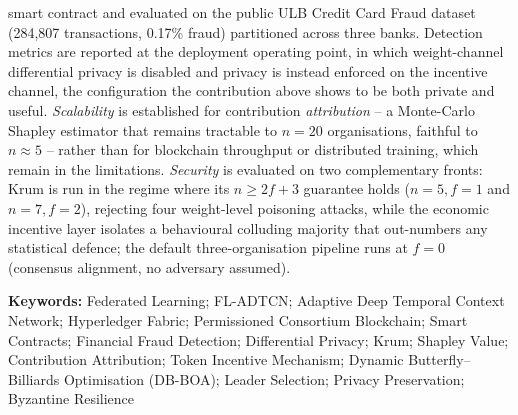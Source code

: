 smart contract and evaluated on the public ULB Credit Card Fraud dataset (284{,}807 transactions,
0.17\% fraud) partitioned across three banks. Detection metrics are reported at the deployment
operating point, in which weight-channel differential privacy is disabled and privacy is instead
enforced on the incentive channel, the configuration the contribution above shows to be both
private and useful. \emph{Scalability} is established for contribution \emph{attribution} -- a
Monte-Carlo Shapley estimator that remains tractable to $n=20$ organisations, faithful to
$n\approx 5$ -- rather than for blockchain throughput or distributed training, which remain in the
limitations. \emph{Security} is evaluated on two complementary fronts: Krum is run in the regime
where its $n\ge 2f+3$ guarantee holds ($n=5,f=1$ and $n=7,f=2$), rejecting four weight-level
poisoning attacks, while the economic incentive layer isolates a behavioural colluding majority
that out-numbers any statistical defence; the default three-organisation pipeline runs at $f=0$
(consensus alignment, no adversary assumed).

\vspace{1cm}
\textbf{Keywords: }Federated Learning; FL-ADTCN; Adaptive Deep Temporal Context Network;
Hyperledger Fabric; Permissioned Consortium Blockchain; Smart Contracts; Financial Fraud
Detection; Differential Privacy; Krum; Shapley Value; Contribution Attribution; Token
Incentive Mechanism; Dynamic Butterfly--Billiards Optimisation (DB-BOA); Leader Selection;
Privacy Preservation; Byzantine Resilience
\pagebreak

